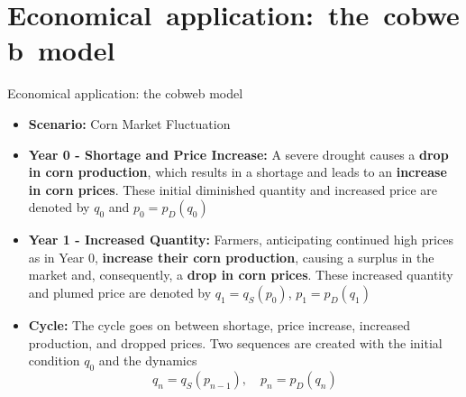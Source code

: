 \documentclass[9pt]{beamer}
\begin{document}
\section{\mbox{Economical application: the cobweb model}}

\begin{frame}{Economical application: the cobweb model}

    \begin{itemize}[leftmargin = 0.5cm, label = $\bullet$, rightmargin = 0.2cm]
        \item[1.] \textbf{Scenario:} Corn Market Fluctuation

        \item[2.] \textbf{Year 0 - Shortage and Price Increase:} 
        A severe drought causes a \textbf{drop in corn production}, which results in a shortage and leads to an \textbf{increase in corn prices}. These initial diminished quantity and increased price are denoted by $q_0$ and $p_0 = p_D(q_0)$
    
        \item[3.] \textbf{Year 1 - Increased Quantity:} 
        Farmers, anticipating continued high prices as in Year 0, \textbf{increase their corn production}, causing a surplus in the market and, consequently, a \textbf{drop in corn prices}. These increased quantity and plumed price are denoted by $q_1 = q_S(p_0)$, $p_1 = p_D(q_1)$

        \item[4.] \textbf{Cycle:}
        The cycle goes on between shortage, price increase, increased production, and dropped prices. Two sequences are created with the initial condition $q_0$ and the dynamics
        $$
        q_n = q_S(p_{n-1}), \quad p_n = p_D(q_n)
        $$
    \end{itemize}

\end{frame}
\end{document}
